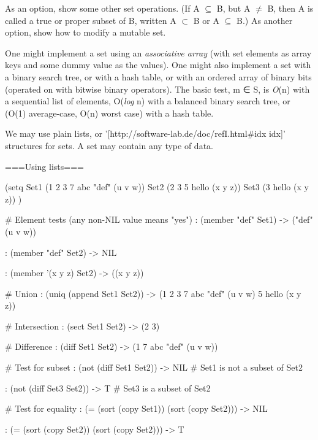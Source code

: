 As an option, show some other set operations. (If A $\subseteq$ B, but
A $\neq$ B, then A is called a true or proper subset of B, written A
$\subset$ B or A $\subseteq$ B.) As another option, show how to modify
a mutable set.

One might implement a set using an \emph{associative array} (with set
elements as array keys and some dummy value as the values). One might
also implement a set with a binary search tree, or with a hash table,
or with an ordered array of binary bits (operated on with bitwise
binary operators). The basic test, m ∈ S, is \emph{O}(n) with a
sequential list of elements, O(\emph{log} n) with a balanced binary
search tree, or (O(1) average-case, O(n) worst case) with a hash
table.


\begin{wideverbatim}

We may use plain lists, or '[http://software-lab.de/doc/refI.html#idx idx]'
structures for sets. A set may contain any type of data.

===Using lists===

(setq
   Set1 (1 2 3 7 abc "def" (u v w))
   Set2 (2 3 5 hello (x y z))
   Set3 (3 hello (x y z)) )


# Element tests (any non-NIL value means "yes")
: (member "def" Set1)
-> ("def" (u v w))

: (member "def" Set2)
-> NIL

: (member '(x y z) Set2)
-> ((x y z))


# Union
: (uniq (append Set1 Set2))
-> (1 2 3 7 abc "def" (u v w) 5 hello (x y z))


# Intersection
: (sect Set1 Set2)
-> (2 3)


# Difference
: (diff Set1 Set2)
-> (1 7 abc "def" (u v w))


# Test for subset
: (not (diff Set1 Set2))
-> NIL  # Set1 is not a subset of Set2

: (not (diff Set3 Set2))
-> T  # Set3 is a subset of Set2


# Test for equality
: (= (sort (copy Set1)) (sort (copy Set2)))
-> NIL

: (= (sort (copy Set2)) (sort (copy Set2)))
-> T

\end{wideverbatim}

